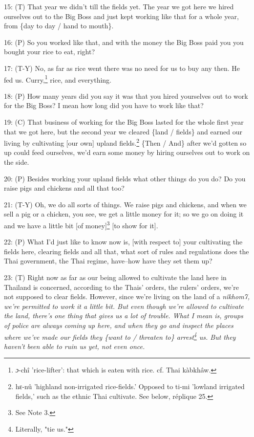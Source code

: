 15: (T) That year we didn't till the fields yet. The year we got here we hired
ourselves out to the Big Boss and just kept working like that for a whole year,
from \{day to day / hand to mouth\}.

16: (P) So you worked like that, and with the money the Big Boss paid you you bought
your rice to eat, right?

17: (T-Y) No, as far as rice went there was no need for us to buy any then. He
fed us. Curry,\footnote{\emph{ɔ}-chî 'rice-lifter': that which is eaten with rice. cf. Thai kàbkhâw.} rice, and everything.

18: (P) How many years did you say it was that you hired yourselves out to work
for the Big Boss? I mean how long did you have to work like that?

19: (C) That business of working for the Big Boss lasted for the whole first year
that we got here, but the second year we cleared \{land / fields\} and earned our
living by cultivating [our own] upland fields.\footnote{hɛ-nû 'highland non-irrigated rice-fields.' Opposed to ti-mi 'lowland irrigated fields,' such as the ethnic Thai cultivate. See below, réplique 25.} \{Then / And\} after we'd gotten
so up could feed ourselves, we'd earn some money by hiring ourselves out to work
on the side.

20: (P) Besides working your upland fields what other things do you do? Do you
raise pigs and chickens and all that too?

21: (T-Y) Oh, we do all sorts of things. We raise pigs and chickens, and when we
sell a pig or a chicken, you see, we get a little money for it; so we go on doing
it and we have a little bit [of money]\footnote{See Note 3.} [to show for it].

22: (P) What I'd just like to know now is, [with respect to] your cultivating the
fields here, clearing fields and all that, what sort of rules and regulations does
the Thai government, the Thai regime, have--how have they set them up?

23: (T) Right now as far as our being allowed to cultivate the land here in Thailand
is concerned, according to the Thais' orders, the rulers' orders, we're not supposed
to clear fields. However, since we're living on the land of a \textit{nîkhom7,
we're permitted to work it a little bit. But even though we're allowed to cultivate
the land, there's one thing that gives us a lot of trouble. What I mean is, groups
of police are always coming up here, and when they go and inspect the places where
we've made our fields they \{want to / threaten to\} arrest\footnote{Literally, "tie us."} us. But they haven't
been able to ruin us yet, not even once. }

